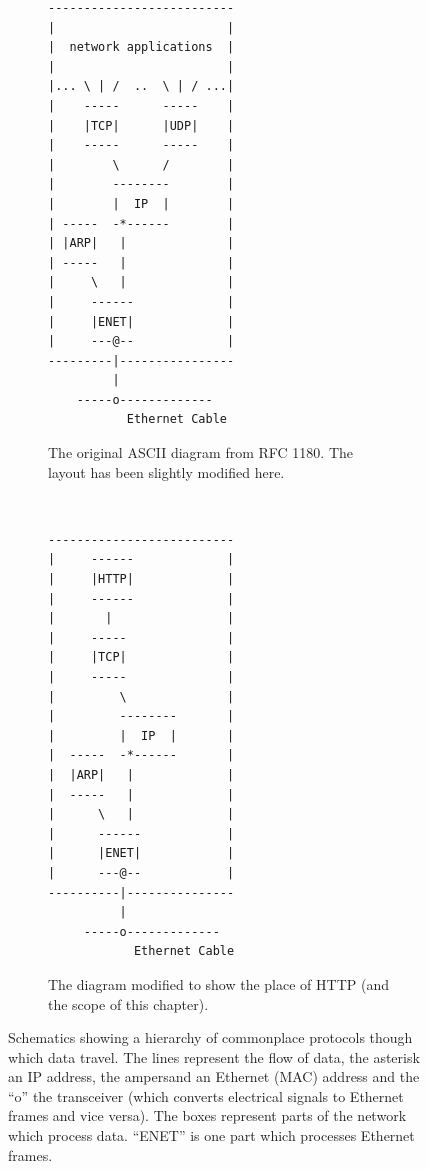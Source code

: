 \documentclass[11pt,a4paper]{report}
\begin{document}
	\begin{figure}
		\centering
		\begin{subfigure}[t]{0.48\textwidth}
			\centering
			\begin{BVerbatim}[baselinestretch=0]
--------------------------
|                        |
|  network applications  |
|                        |
|... \ | /  ..  \ | / ...|
|    -----      -----    |
|    |TCP|      |UDP|    |
|    -----      -----    |
|        \      /        |
|        --------        |
|        |  IP  |        |
| -----  -*------        |
| |ARP|   |              |
| -----   |              |
|     \   |              |
|     ------             |
|     |ENET|             |
|     ---@--             |
---------|----------------
         |
    -----o-------------
           Ethernet Cable
			\end{BVerbatim}
			\caption{The original ASCII diagram from RFC 1180. The layout has been slightly modified here.}
			\label{fig:tcpiporiginal}
		\end{subfigure}~~
		\begin{subfigure}[t]{0.48\textwidth}
			\centering
			\begin{BVerbatim}[baselinestretch=0]
--------------------------
|     ------             |
|     |HTTP|             |
|     ------             |
|       |                |
|     -----              |
|     |TCP|              |
|     -----              |
|         \              |
|         --------       |
|         |  IP  |       |
|  -----  -*------       |
|  |ARP|   |             |
|  -----   |             |
|      \   |             |
|      ------            |
|      |ENET|            |
|      ---@--            |
----------|---------------
          |
     -----o-------------
            Ethernet Cable
			\end{BVerbatim}
			\caption{The diagram modified to show the place of HTTP (and the scope of this chapter).}
			\label{fig:tcpipmodified}
		\end{subfigure}
		\caption{Schematics showing a hierarchy of commonplace protocols though which data travel. The lines represent the flow of data, the asterisk an IP address, the ampersand an Ethernet (MAC) address and the ``o'' the transceiver (which converts electrical signals to Ethernet frames and vice versa). The boxes represent parts of the network which process data. ``ENET'' is one part which processes Ethernet frames.}
		\label{fig:tcpip}
	\end{figure}
	
\end{document}
